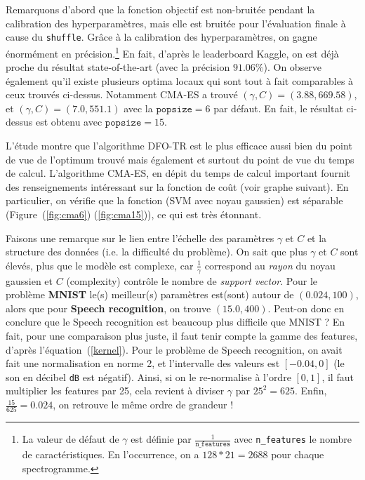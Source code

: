 \documentclass[12 pt, a4paper]{article}
\begin{document}
Remarquons d'abord que la fonction objectif est non-bruitée pendant la calibration des hyperparamètres, mais elle est bruitée pour l'évaluation finale à cause du \texttt{shuffle}. Grâce à la calibration des hyperparamètres, on gagne énormément en précision.\footnote{La valeur de défaut de $\gamma$ est définie par $\frac{1}{\texttt{n\_features}}$ avec \texttt{n\_features} le nombre de caractéristiques. En l'occurrence, on a $128*21 = 2688$ pour chaque spectrogramme.} En fait, d'après le leaderboard Kaggle, on est déjà proche du résultat state-of-the-art (avec la précision $91.06\%$)\cite{leaderboard}. On observe également qu'il existe plusieurs optima locaux qui sont tout à fait comparables à ceux trouvés ci-dessus. Notamment CMA-ES a trouvé $(\gamma, C) = (3.88, 669.58)$, et $(\gamma, C) = (7.0, 551.1)$ avec la $\texttt{popsize}=6$ par défaut. En fait, le résultat ci-dessus est obtenu avec $\texttt{popsize} = 15$.


L'étude montre que l'algorithme DFO-TR est le plus efficace aussi bien du point de vue de l'optimum trouvé mais également et surtout du point de vue du temps de calcul. L'algorithme CMA-ES, en dépit du temps de calcul important fournit des renseignements intéressant sur la fonction de coût (voir graphe suivant). En particulier, on vérifie que la fonction (SVM avec noyau gaussien) est séparable (Figure~(\ref{fig:cma6}) (\ref{fig:cma15})), ce qui est très étonnant.

Faisons une remarque sur le lien entre l'échelle des paramètres $\gamma$ et $C$ et la structure des données (i.e. la difficulté du problème). On sait que plus $\gamma$ et $C$ sont élevés, plus que le modèle est complexe, car $\frac{1}{\gamma}$ correspond au \textit{rayon} du noyau gaussien et $C$ (complexity) contrôle le nombre de \textit{support vector}. Pour le problème \textbf{MNIST} le(s) meilleur(s) paramètres est(sont) autour de $(0.024, 100)$, alors que pour \textbf{Speech recognition}, on trouve $(15.0, 400)$. Peut-on donc en conclure que le Speech recognition est beaucoup plus difficile que MNIST ? En fait, pour une comparaison plus juste, il faut tenir compte la gamme des features, d'après l'équation~(\ref{kernel}). Pour le problème de Speech recognition, on avait fait une normalisation en norme 2, et l'intervalle des valeurs est $[-0.04, 0]$ (le son en décibel \texttt{dB} est négatif). Ainsi, si on le re-normalise à l'ordre $[0, 1]$, il faut multiplier les features par 25, cela revient à diviser $\gamma$ par $25^2 = 625$. Enfin, $\frac{15}{625} = 0.024$, on retrouve le même ordre de grandeur !  
\end{document}

